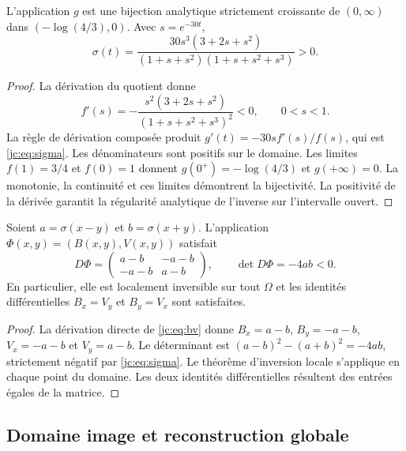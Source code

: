 \begin{lemma}
L’application $g$ est une bijection analytique strictement croissante de $(0,\infty)$ dans $(-\log(4/3),0)$. Avec $s=e^{-30t}$,
\begin{equation}
\sigma(t)=
\frac{30s^3(3+2s+s^2)}{(1+s+s^2)(1+s+s^2+s^3)}>0.
\label{jc:eq:sigma}
\end{equation}
\end{lemma}
\begin{proof}
La dérivation du quotient donne
\[
f'(s)=-\frac{s^2(3+2s+s^2)}{(1+s+s^2+s^3)^2}<0,
\qquad 0<s<1.
\]
La règle de dérivation composée produit $g'(t)=-30s f'(s)/f(s)$, qui est \eqref{jc:eq:sigma}. Les dénominateurs sont positifs sur le domaine. Les limites $f(1)=3/4$ et $f(0)=1$ donnent $g(0^+)=-\log(4/3)$ et $g(+\infty)=0$. La monotonie, la continuité et ces limites démontrent la bijectivité. La positivité de la dérivée garantit la régularité analytique de l’inverse sur l’intervalle ouvert.
\end{proof}

\begin{theorem}
\label{jc:thm:jacobiano} Soient $a=\sigma(x-y)$ et $b=\sigma(x+y)$. L’application $\Phi(x,y)=(B(x,y),V(x,y))$ satisfait
\begin{equation}
D\Phi=
\begin{pmatrix}a-b&-a-b\\-a-b&a-b\end{pmatrix},\qquad
\det D\Phi=-4ab<0.
\label{jc:eq:jacobiano}
\end{equation}
En particulier, elle est localement inversible sur tout $\Omega$ et les identités différentielles $B_x=V_y$ et $B_y=V_x$ sont satisfaites.
\end{theorem}
\begin{proof}
La dérivation directe de \eqref{jc:eq:bv} donne $B_x=a-b$, $B_y=-a-b$, $V_x=-a-b$ et $V_y=a-b$. Le déterminant est $(a-b)^2-(a+b)^2=-4ab$, strictement négatif par \eqref{jc:eq:sigma}. Le théorème d’inversion locale s’applique en chaque point du domaine. Les deux identités différentielles résultent des entrées égales de la matrice.
\end{proof}

\subsection{Domaine image et reconstruction globale}

